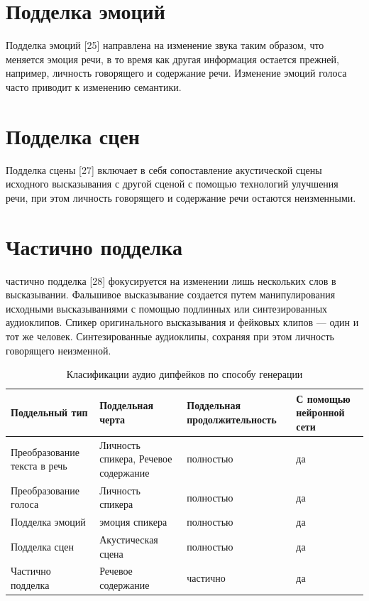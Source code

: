 \section{Подделка эмоций}

Подделка эмоций [25] направлена на изменение звука таким образом, что меняется эмоция речи, в то время как другая информация остается прежней, например, личность говорящего и содержание речи. Изменение эмоций голоса часто приводит к изменению семантики.

\section{Подделка сцен}

Подделка сцены [27] включает в себя сопоставление акустической сцены исходного высказывания с другой сценой с помощью технологий улучшения речи, при этом личность говорящего и содержание речи остаются неизменными.

\section{Частично подделка}

частично подделка [28] фокусируется на изменении лишь нескольких слов в высказывании. Фальшивое высказывание создается путем манипулирования исходными высказываниями с помощью подлинных или синтезированных аудиоклипов. Спикер оригинального высказывания и фейковых клипов — один и тот же человек. Синтезированные аудиоклипы, сохраняя при этом личность говорящего неизменной.

\begin{table}[H]
	\centering
	\setlength{\tabcolsep}{8pt} %
	\renewcommand{\arraystretch}{1.3} %
    \caption{Класификации аудио дипфейков по способу генерации}\label{tab:class}
    \captionsetup{justification=raggedright,singlelinecheck=false}
    \begin{tabular}{|p{3cm}|p{3cm}| p{3cm}| p{3cm}|}		
        \hline
		Поддельный тип & Поддельная черта & Поддельная продолжительность  & С помощью нейронной сети  \\ 
		\hline
		Преобразование  текста в речь    & Личность спикера, Речевое содержание  & полностью	  	 &  да  \\
		\hline
		Преобразование голоса   & Личность спикера & полностью  &  да \\
		\hline
		Подделка эмоций & эмоция спикера 	& полностью  &  да \\
		\hline
		Подделка сцен  & Акустическая сцена & полностью  &  да \\
		\hline
		Частично подделка  & Речевое содержание 	& частично  &  да \\
		\hline
    \end{tabular}
    \label{table::audio-class}
\end{table}

